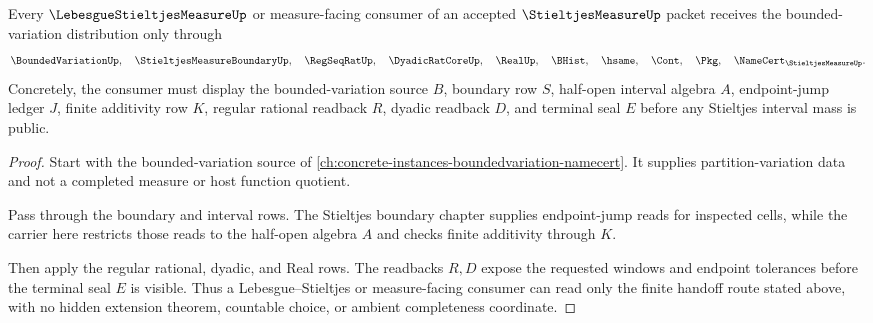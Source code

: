 \begin{theorem}
\label{thm:stieltjes-measure-bounded-variation-handoff}
Every $\LebesgueStieltjesMeasureUp$ or measure-facing consumer of an accepted $\StieltjesMeasureUp$ packet receives the bounded-variation distribution only through
$$
\BoundedVariationUp,\quad
\StieltjesMeasureBoundaryUp,\quad
\RegSeqRatUp,\quad
\DyadicRatCoreUp,\quad
\RealUp,\quad
\BHist,\quad
\hsame,\quad
\Cont,\quad
\Pkg,\quad
\NameCert_{\StieltjesMeasureUp}.
$$
Concretely, the consumer must display the bounded-variation source $B$, boundary row $S$, half-open interval algebra $A$, endpoint-jump ledger $J$, finite additivity row $K$, regular rational readback $R$, dyadic readback $D$, and terminal seal $E$ before any Stieltjes interval mass is public.
\end{theorem}
\begin{proof}
Start with the bounded-variation source of \autoref{ch:concrete-instances-boundedvariation-namecert}. It supplies partition-variation data and not a completed measure or host function quotient.

Pass through the boundary and interval rows. The Stieltjes boundary chapter supplies endpoint-jump reads for inspected cells, while the carrier here restricts those reads to the half-open algebra $A$ and checks finite additivity through $K$.

Then apply the regular rational, dyadic, and Real rows. The readbacks $R,D$ expose the requested windows and endpoint tolerances before the terminal seal $E$ is visible. Thus a Lebesgue--Stieltjes or measure-facing consumer can read only the finite handoff route stated above, with no hidden extension theorem, countable choice, or ambient completeness coordinate.
\end{proof}


